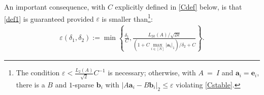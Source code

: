 \documentclass[journal, twocolumn]{IEEEtran}
\newtheorem{remark}{Remark}
\begin{document}

An important consequence, with $C$  explicitly defined in \eqref{Cdef} below, is that \eqref{def1} is guaranteed provided $\varepsilon$ is smaller than\footnote{The condition $\varepsilon < \frac{L_2(A)}{\sqrt{2}}C^{-1}$ is necessary; otherwise,  with \mbox{$A$ = $I$} and $\mathbf{a}_i = \mathbf{e}_i$, there is a $B$ and $1$-sparse $\mathbf{b}_i$ with $|A\mathbf{a}_i - B\mathbf{b}_i|_2 \leq \varepsilon$ violating \eqref{Cstable}.}:
\begin{align*}
\varepsilon(\delta_1, \delta_2) := \min \left\{ \frac{\delta_1}{ C }, \frac{ L_{2k}(A) / \sqrt{2k}}{\left(1 + C \max_{i \in [N]} |\mathbf{a}_i|_1 \right) / \delta_2 + C } \right\}.
\end{align*}
%

\end{document}
